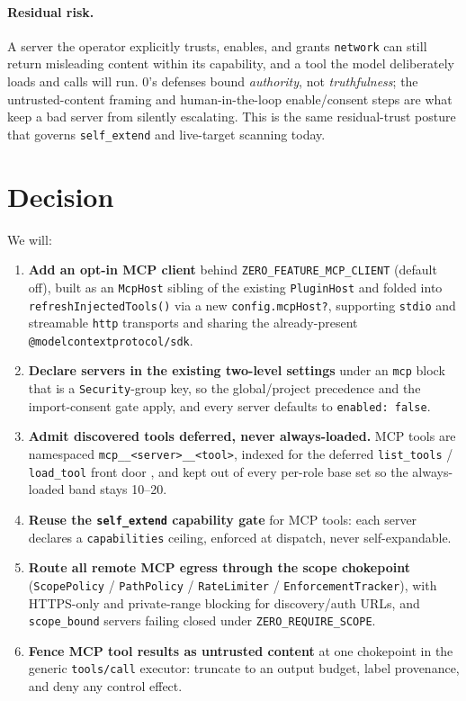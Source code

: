\documentclass[11pt]{article}
\begin{document}
\paragraph{Residual risk.} A server the operator explicitly trusts, enables, and
grants \texttt{network} can still return misleading content within its
capability, and a tool the model deliberately loads and calls will run. 0's
defenses bound \emph{authority}, not \emph{truthfulness}; the untrusted-content
framing and human-in-the-loop enable/consent steps are what keep a bad server
from silently escalating. This is the same residual-trust posture that governs
\texttt{self\_extend} and live-target scanning today.

\section{Decision}

We will:
\begin{enumerate}[leftmargin=*]
  \item \textbf{Add an opt-in MCP client} behind \texttt{ZERO\_FEATURE\_MCP\_CLIENT}
  (default off), built as an \texttt{McpHost} sibling of the existing
  \texttt{PluginHost} and folded into \texttt{refreshInjectedTools()} via a new
  \texttt{config.mcpHost?}, supporting \texttt{stdio} and streamable \texttt{http}
  transports and sharing the already-present \texttt{@modelcontextprotocol/sdk}.
  \item \textbf{Declare servers in the existing two-level settings} under an
  \texttt{mcp} block that is a \texttt{Security}-group key, so the
  global/project precedence and the import-consent gate apply, and every server
  defaults to \texttt{enabled: false}.
  \item \textbf{Admit discovered tools deferred, never always-loaded.} MCP tools
  are namespaced \texttt{mcp\_\_<server>\_\_<tool>}, indexed for the deferred
  \texttt{list\_tools} / \texttt{load\_tool} front door \cite{tool-curation}, and
  kept out of every per-role base set so the always-loaded band stays 10--20.
  \item \textbf{Reuse the \texttt{self\_extend} capability gate} for MCP tools:
  each server declares a \texttt{capabilities} ceiling, enforced at dispatch,
  never self-expandable.
  \item \textbf{Route all remote MCP egress through the scope chokepoint}
  (\texttt{ScopePolicy} / \texttt{PathPolicy} / \texttt{RateLimiter} /
  \texttt{EnforcementTracker}), with HTTPS-only and private-range blocking for
  discovery/auth URLs, and \texttt{scope\_bound} servers failing closed under
  \texttt{ZERO\_REQUIRE\_SCOPE}.
  \item \textbf{Fence MCP tool results as untrusted content} at one chokepoint in
  the generic \texttt{tools/call} executor: truncate to an output budget, label
  provenance, and deny any control effect.
\end{enumerate}
\end{document}
